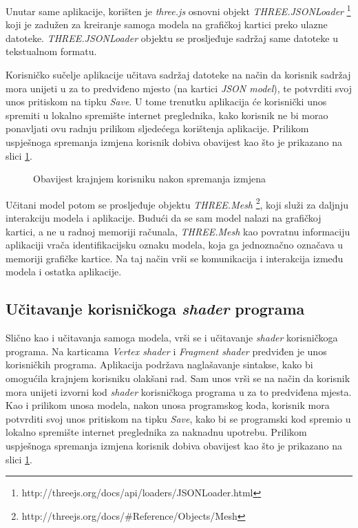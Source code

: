 Unutar same aplikacije, korišten je \emph{three.js} osnovni objekt \emph{THREE.JSONLoader} \footnote{http://threejs.org/docs/api/loaders/JSONLoader.html} koji je zadužen za kreiranje samoga modela na grafičkoj kartici preko ulazne datoteke. \emph{THREE.JSONLoader} objektu se prosljeđuje sadržaj same datoteke u tekstualnom formatu.

Korisničko sučelje aplikacije učitava sadržaj datoteke na način da korisnik sadržaj mora unijeti u za to predviđeno mjesto (na kartici \emph{JSON model}), te potvrditi svoj unos pritiskom na tipku \emph{Save}. U tome trenutku aplikacija će korisnički unos spremiti u lokalno spremište internet preglednika, kako korisnik ne bi morao ponavljati ovu radnju prilikom sljedećega korištenja aplikacije. Prilikom uspješnoga spremanja izmjena korisnik dobiva obavijest kao što je prikazano na slici \ref{fig:interface-save}.

\begin{figure}[H]
\centering{}
\caption{Obavijest krajnjem korisniku nakon spremanja izmjena}
\label{fig:interface-save}
\end{figure}

Učitani model potom se prosljeđuje objektu \emph{THREE.Mesh} \footnote{http://threejs.org/docs/\#Reference/Objects/Mesh}, koji služi za daljnju interakciju modela i aplikacije. Budući da se sam model nalazi na grafičkoj kartici, a ne u radnoj memoriji računala, \emph{THREE.Mesh} kao povratnu informaciju aplikaciji vrača identifikacijsku oznaku modela, koja ga jednoznačno označava u memoriji grafičke kartice. Na taj način vrši se komunikacija i interakcija između modela i ostatka aplikacije.

\subsection{Učitavanje korisničkoga \emph{shader} programa}

Slično kao i učitavanja samoga modela, vrši se i učitavanje \emph{shader} korisničkoga programa. Na karticama \emph{Vertex shader} i \emph{Fragment shader} predviđen je unos korisničkih programa. Aplikacija podržava naglašavanje sintakse, kako bi omogućila krajnjem korisniku olakšani rad. Sam unos vrši se na način da korisnik mora unijeti izvorni kod \emph{shader} korisničkoga programa u za to predviđena mjesta. Kao i prilikom unosa modela, nakon unosa programskog koda, korisnik mora potvrditi svoj unos pritiskom na tipku \emph{Save}, kako bi se programski kod spremio u lokalno spremište internet preglednika za naknadnu upotrebu. Prilikom uspješnoga spremanja izmjena korisnik dobiva obavijest kao što je prikazano na slici \ref{fig:interface-save}.

